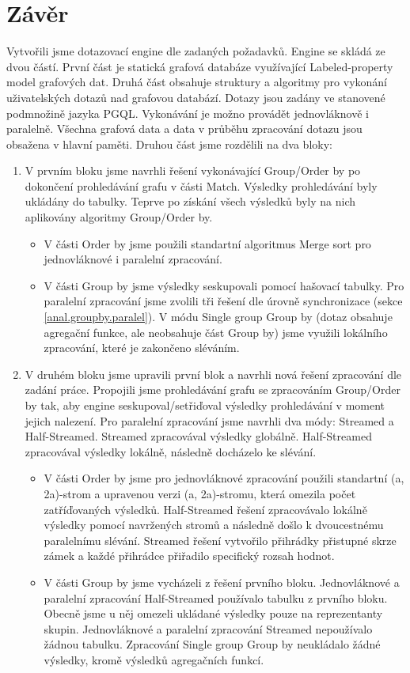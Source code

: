 \chapter{Závěr}

Vytvořili jsme dotazovací engine dle zadaných požadavků.
Engine se skládá ze dvou částí.
První část je statická grafová databáze využívající Labeled-property model grafových dat. 
Druhá část obsahuje struktury a algoritmy pro vykonání uživatelských dotazů nad grafovou databází.
Dotazy jsou zadány ve stanovené podmnožině jazyka PGQL.
Vykonávání je možno provádět jednovláknově i paralelně.
Všechna grafová data a data v průběhu zpracování dotazu jsou obsažena v hlavní paměti.
Druhou část jsme rozdělili na dva bloky:
\begin{enumerate}
\item
V prvním bloku jsme navrhli řešení vykonávající Group/Order by po dokončení prohledávání grafu v části Match.
Výsledky prohledávání byly ukládány do tabulky.
Teprve po získání všech výsledků byly na nich aplikovány algoritmy Group/Order by.
\begin{itemize}
\item V části Order by jsme použili standartní algoritmus Merge sort pro jednovláknové i paralelní zpracování.
\item V části Group by jsme výsledky seskupovali pomocí hašovací tabulky.
Pro paralelní zpracování jsme zvolili tři řešení dle úrovně synchronizace (sekce \ref{anal.groupby.paralel}).
V módu Single group Group by (dotaz obsahuje agregační funkce, ale neobsahuje část Group by) jsme využili lokálního zpracování, které je zakončeno sléváním.
\end{itemize}

\item
V druhém bloku jsme upravili první blok a navrhli nová řešení zpracování dle zadání práce.
Propojili jsme prohledávání grafu se zpracováním Group/Order by tak, aby engine seskupoval/setřiďoval výsledky prohledávání v moment jejich nalezení.
Pro paralelní zpracování jsme navrhli dva módy: Streamed a Half-Streamed.
Streamed zpracovával výsledky globálně.
Half-Streamed zpracovával výsledky lokálně, následně docházelo ke slévání.
\begin{itemize}
\item V části Order by jsme pro jednovláknové zpracování použili standartní (a, 2a)-strom a upravenou verzi (a, 2a)-stromu, která omezila počet zatříďovaných výsledků.  
Half-Streamed řešení zpracovávalo lokálně výsledky pomocí navržených stromů a následně došlo k dvoucestnému paralelnímu slévání.
Streamed řešení vytvořilo přihrádky přistupné skrze zámek a každé přihrádce přiřadilo specifický rozsah hodnot.
\item
V části Group by jsme vycházeli z řešení prvního bloku.
Jednovláknové a paralelní zpracování Half-Streamed používalo tabulku z prvního bloku.
Obecně jsme u něj omezeli ukládané výsledky pouze na reprezentanty skupin.
Jednovláknové a paralelní zpracování Streamed nepoužívalo žádnou tabulku.
Zpracování Single group Group by neukládalo žádné výsledky, kromě výsledků agregačních funkcí.
\end{itemize}
\end{enumerate}

